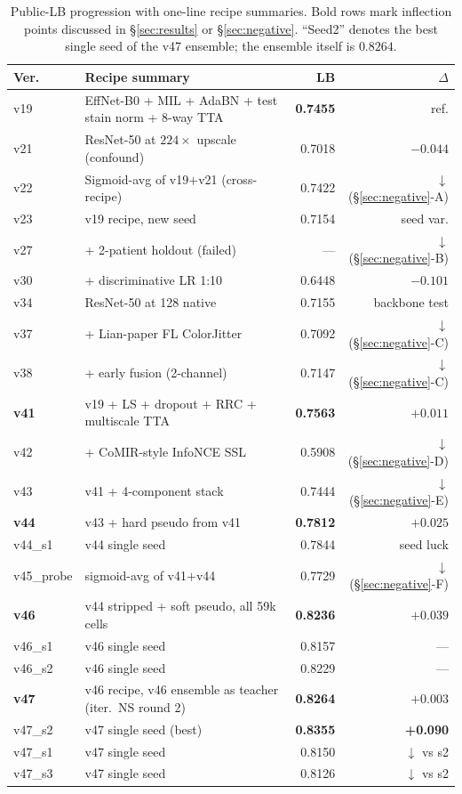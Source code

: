 \documentclass[conference]{IEEEtran}
\begin{document}
\begin{table}[!t]
  \centering
  \caption{Public-LB progression with one-line recipe summaries. Bold rows mark inflection points discussed in \S\ref{sec:results} or \S\ref{sec:negative}. ``Seed2'' denotes the best single seed of the v47 ensemble; the ensemble itself is $0.8264$.}
  \label{tab:progression}
  \footnotesize
  \begin{tabular}{@{}lp{8.5cm}rr@{}}
    \toprule
    Ver. & Recipe summary & LB & $\Delta$ \\
    \midrule
    v19 & EffNet-B0 + MIL + AdaBN + test stain norm + 8-way TTA & \textbf{0.7455} & ref. \\
    v21 & ResNet-50 at $224\times$ upscale (confound) & 0.7018 & $-0.044$ \\
    v22 & Sigmoid-avg of v19$+$v21 (cross-recipe) & 0.7422 & $\downarrow$ (\S\ref{sec:negative}-A) \\
    v23 & v19 recipe, new seed & 0.7154 & seed var. \\
    v27 & + 2-patient holdout (failed) & --- & $\downarrow$ (\S\ref{sec:negative}-B) \\
    v30 & + discriminative LR 1:10 & 0.6448 & $-0.101$ \\
    v34 & ResNet-50 at 128 native & 0.7155 & backbone test \\
    v37 & + Lian-paper FL ColorJitter & 0.7092 & $\downarrow$ (\S\ref{sec:negative}-C) \\
    v38 & + early fusion (2-channel) & 0.7147 & $\downarrow$ (\S\ref{sec:negative}-C) \\
    \textbf{v41} & v19 + LS + dropout + RRC + multiscale TTA & \textbf{0.7563} & $\mathbf{+0.011}$ \\
    v42 & + CoMIR-style InfoNCE SSL & 0.5908 & $\downarrow$ (\S\ref{sec:negative}-D) \\
    v43 & v41 + 4-component stack & 0.7444 & $\downarrow$ (\S\ref{sec:negative}-E) \\
    \textbf{v44} & v43 + hard pseudo from v41 & \textbf{0.7812} & $\mathbf{+0.025}$ \\
    v44\_s1 & v44 single seed & 0.7844 & seed luck \\
    v45\_probe & sigmoid-avg of v41$+$v44 & 0.7729 & $\downarrow$ (\S\ref{sec:negative}-F) \\
    \textbf{v46} & v44 stripped + soft pseudo, all 59k cells & \textbf{0.8236} & $\mathbf{+0.039}$ \\
    v46\_s1 & v46 single seed & 0.8157 & --- \\
    v46\_s2 & v46 single seed & 0.8229 & --- \\
    \textbf{v47} & v46 recipe, v46 ensemble as teacher (iter.~NS round 2) & \textbf{0.8264} & $\mathbf{+0.003}$ \\
    v47\_s2 & v47 single seed (best) & \textbf{0.8355} & \textbf{+0.090} \\
    v47\_s1 & v47 single seed & 0.8150 & $\downarrow$ vs s2 \\
    v47\_s3 & v47 single seed & 0.8126 & $\downarrow$ vs s2 \\
    \bottomrule
  \end{tabular}
\end{table}
\end{document}
